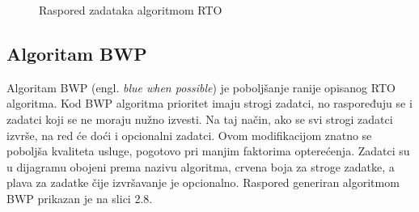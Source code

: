 \documentclass[../zavrsni.tex]{subfiles}
\begin{document}
\begin{figure}[h!]
    \centering

    \begin{RTGrid}[width=13cm]{3}{24}

    
  
    
    

    \end{RTGrid}

    \caption{Raspored zadataka algoritmom RTO}
    \label{fig:ex1}
  \end{figure}


\subsection{Algoritam BWP}

Algoritam BWP (engl. \textit{blue when possible}) je poboljšanje ranije opisanog RTO algoritma. Kod BWP algoritma prioritet imaju strogi zadatci, 
no raspoređuju se i zadatci koji se ne moraju nužno izvesti. Na taj način, ako se svi strogi zadatci izvrše, na red će doći
i opcionalni zadatci. Ovom modifikacijom znatno se poboljša kvaliteta usluge, pogotovo pri
 manjim faktorima opterećenja. Zadatci su u dijagramu obojeni prema nazivu algoritma, crvena boja za stroge zadatke, a plava za zadatke 
 čije izvršavanje je opcionalno. Raspored generiran algoritmom BWP prikazan je na slici 2.8.
\end{document}
